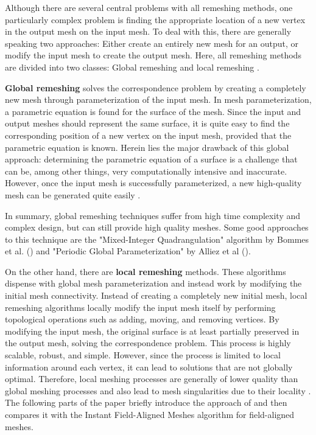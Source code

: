 \documentclass{ACGSeminar}
\begin{document}
Although there are several central problems with all remeshing methods, one particularly complex problem is finding the appropriate location of a new vertex in the output mesh on the input mesh. To deal with this, there are generally speaking two approaches: Either create an entirely new mesh for an output, or modify the input mesh to create the output mesh. Here, all remeshing methods are divided into two classes: Global remeshing and local remeshing \cite{botsch2007geometric,alliez2008recent}.\bigskip

\textbf{Global remeshing} solves the correspondence problem by creating a completely new mesh through parameterization of the input mesh. In mesh parameterization, a parametric equation is found for the surface of the mesh. Since the input and output meshes should represent the same surface, it is quite easy to find the corresponding position of a new vertex on the input mesh, provided that the parametric equation is known. Herein lies the major drawback of this global approach: determining the parametric equation of a surface is a challenge that can be, among other things, very computationally intensive and inaccurate. However, once the input mesh is successfully parameterized, a new high-quality mesh can be generated quite easily \cite{jakob2015instant,alliez2008recent}.

In summary, global remeshing techniques suffer from high time complexity and complex design, but can still provide high quality meshes. Some good approaches to this technique are the "Mixed-Integer Quadrangulation" algorithm by Bommes et al. (\cite{bommes2009mixed}) and "Periodic Global Parameterization" by Alliez et al (\cite{ray2006periodic}).\bigskip

On the other hand, there are \textbf{local remeshing} methods. These algorithms dispense with global mesh parameterization and instead work by modifying the initial mesh connectivity. Instead of creating a completely new initial mesh, local remeshing algorithms locally modify the input mesh itself by performing topological operations such as adding, moving, and removing vertices. By modifying the input mesh, the original surface is at least partially preserved in the output mesh, solving the correspondence problem. This process is highly scalable, robust, and simple. However, since the process is limited to local information around each vertex, it can lead to solutions that are not globally optimal. Therefore, local meshing processes are generally of lower quality than global meshing processes and also lead to mesh singularities due to their locality \cite{jakob2015instant,alliez2008recent}. The following parts of the paper briefly introduce the approach of \cite{tarini2010practical} and then compares it with the Instant Field-Aligned Meshes algorithm for field-aligned meshes.
\end{document}
